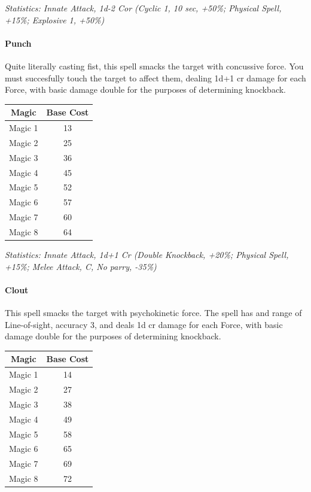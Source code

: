 \begin{multicols}{3}
	\textcolor{OliveGreen}{\textit{Statistics: Innate Attack, 1d-2 Cor (Cyclic 1, 10 sec, +50\%; Physical Spell, +15\%; Explosive 1, +50\%)}}
	
	\paragraph{Punch}
	
	Quite literally casting fist, this spell smacks the target with concussive force. You must succesfully touch the target to affect them, dealing 1d+1 cr damage for each Force, with basic damage double for the purposes of determining knockback.
	
	\begin{center}
		\begin{tabular}{|c|c|}
			\hline
			Magic & Base Cost \\
			\hline
			\hline
			Magic 1 & 13 \\
			Magic 2 & 25 \\
			Magic 3 & 36 \\
			Magic 4 & 45 \\
			Magic 5 & 52 \\
			Magic 6 & 57 \\
			Magic 7 & 60 \\
			Magic 8 & 64 \\
			\hline
		\end{tabular}
	\end{center}
	
	\textcolor{OliveGreen}{\textit{Statistics: Innate Attack, 1d+1 Cr (Double Knockback, +20\%; Physical Spell, +15\%; Melee Attack, C, No parry, -35\%)}}
	
	\paragraph{Clout}
	
	This spell smacks the target with psychokinetic force. The spell has and range of Line-of-sight, accuracy 3, and deals 1d cr damage for each Force, with basic damage double for the purposes of determining knockback.
	
	\begin{center}
		\begin{tabular}{|c|c|}
			\hline
			Magic & Base Cost \\
			\hline
			\hline
			Magic 1 & 14 \\
			Magic 2 & 27 \\
			Magic 3 & 38 \\
			Magic 4 & 49 \\
			Magic 5 & 58 \\
			Magic 6 & 65 \\
			Magic 7 & 69 \\
			Magic 8 & 72 \\
			\hline
		\end{tabular}
	\end{center}
	

\end{multicols}
